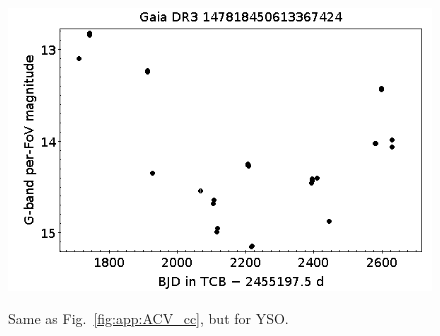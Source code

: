 \documentclass[longauth]{aa}
\begin{document}
\begin{appendix}
\begin{figure}
\hspace{2mm}
 \includegraphics[width=0.45\hsize]{figures/appendix/YSO-48.png} \\
\vspace{4mm}
 \caption{Same as Fig.~\ref{fig:app:ACV_cc}, but for YSO.}
 \label{fig:app:YSO_cc}
\end{figure}




\end{appendix}
\end{document}
